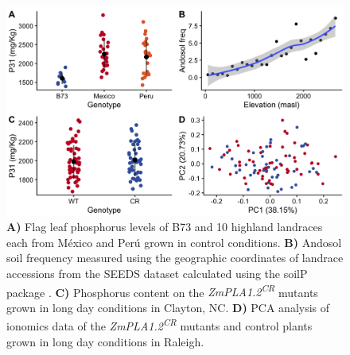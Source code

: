 \documentclass[9pt,twocolumn,twoside,lineno]{BioRxiv}
\begin{document}
\clearpage

\begin{figure}[t]
\begin{center}
\includegraphics[width=0.8\paperwidth]{Sup_Figures/Sup_Fig_6.png}
\caption{\textbf{A)} Flag leaf phosphorus levels of B73 and 10 highland landraces each from México and Perú grown in control conditions.
\textbf{B)} Andosol soil frequency measured using the geographic coordinates of landrace accessions from the SEEDS dataset calculated using the soilP package \cite{Rodriguez-Zapata2018-vz}.
\textbf{C)} Phosphorus content on the \textit{ZmPLA1.2\textsuperscript{CR}} mutants grown in long day conditions in Clayton, NC.
\textbf{D)} PCA analysis of ionomics data of the \textit{ZmPLA1.2\textsuperscript{CR}} mutants and control plants grown in long day conditions in Raleigh.
}
\label{SupFig6}
\end{center}
\end{figure} 

\clearpage
\end{document}
